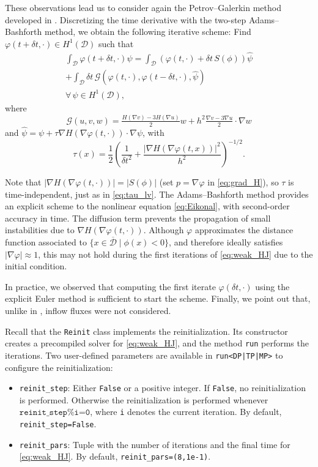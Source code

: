 \documentclass[iicol,pdflatex,sn-mathphys-ay]{sn-jnl}%
\theoremstyle{thmstyleone}%
\theoremstyle{thmstyletwo}%
\theoremstyle{thmstylethree}%
\begin{document}
These observations lead us to consider again
the Petrov--Galerkin method developed in \cite{MR1640142}. 
Discretizing the time derivative with the two-step Adams--Bashforth method,
we obtain the following iterative scheme:
Find $\varphi(t + \delta t, \cdot) \in H^1(\mathcal{D})$ such that
\begin{equation}\label{eq:weak_HJ}
\begin{aligned}
	\int_{\mathcal{D}}  \varphi(t + \delta t, \cdot) \hat{\psi} =
	\int_{\mathcal{D}} (\varphi(t, \cdot) + {\delta t} \, S(\phi)) \hat{\psi}\\
	+\int_{\mathcal{D}} {\delta t}\,
	\mathcal{G}(\varphi(t, \cdot), \varphi(t - \delta t, \cdot), \hat{\psi})\\
	\forall \, \psi\in H^1(\mathcal{D}),	
\end{aligned}
\end{equation}
where
\[
	\mathcal{G}(u, v, w) = \tfrac{H(\nabla v)-3H(\nabla u)}{2} w +
	h^2 \tfrac{\nabla v - 3\nabla u}{2} \cdot \nabla w
\]
and $\hat{\psi}=\psi+\tau\nabla H(\nabla\varphi(t,\cdot))\cdot\nabla\psi$, with 
\begin{equation}
	\tau(x) = \frac{1}{2}\left(\frac{1}{\delta t^2}  +
	\frac{|\nabla H(\nabla \varphi(t, x))|^2}{h^2}\right)^{-1/2}.
\end{equation}

Note that $|\nabla H(\nabla \varphi(t, \cdot))|=|S(\phi)|$
(set $p=\nabla\varphi$ in \eqref{eq:grad_H}),
so $\tau$ is time-independent, just as in \eqref{eq:tau_lv}.
The Adams--Bashforth method provides an explicit scheme
to the nonlinear equation \eqref{eq:Eikonal},
with second-order accuracy in time.
The diffusion term prevents the propagation of
small instabilities due to $\nabla H(\nabla \varphi (t, \cdot))$.
Although $\varphi$ approximates the distance function
associated to $\{x\in\overline{\mathcal{D}} \mid \phi(x)<0\}$, and
therefore ideally satisfies $|\nabla\varphi| \approx 1$,
this may not hold during the first iterations of \eqref{eq:weak_HJ}
due to the initial condition.

In practice, we observed that computing
the first iterate $\varphi(\delta t, \cdot)$
using the explicit Euler method is sufficient to start the scheme.
Finally, we point out that, unlike in \cite{MR1640142},
inflow fluxes were not considered.

Recall that the \texttt{Reinit} class implements the reinitialization.
Its constructor creates a precompiled solver for \eqref{eq:weak_HJ},
and the method \texttt{run} performs the iterations.
Two user-defined parameters are available in \texttt{run<DP|TP|MP>}
to configure the reinitialization:
\begin{itemize}
	\item \texttt{reinit\_step}:
	Either \texttt{False} or a positive integer.
	If \texttt{False}, no reinitialization is performed. Otherwise
	the reinitialization is performed whenever $\texttt{reinit\_step\%i=0}$, where
	\texttt{i} denotes the current iteration. By default, \texttt{reinit\_step=False}.
	\item \texttt{reinit\_pars}:
	Tuple with the number of iterations and the final time for \eqref{eq:weak_HJ}.
	By default, \texttt{reinit\_pars=(8,1e-1)}.
\end{itemize}
\end{document}
